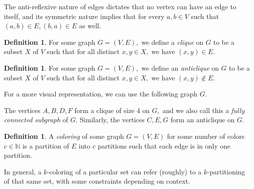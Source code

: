 \documentclass[12pt]{amsart}
\newcommand{\NN}{\mathbb{N}}
\theoremstyle{plain}
\theoremstyle{definition}
\newtheorem{defn}[thm]{Definition}
\theoremstyle{remark}
\theoremstyle{theorem}
\numberwithin{equation}{section}
\numberwithin{thm}{section}
\begin{document}
The anti-reflexive nature of edges dictates that no vertex can have an edge to itself, and its symmetric nature implies that for every $a, b \in V$ such that $(a,b) \in E, (b,a) \in E$ as well.
\begin{defn}
For some graph $G = (V,E),$ we define a \textit{clique} on $G$ to be a subset $X$ of $V$ such that for all distinct $x,y \in X,$ we have $(x,y) \in E.$
\end{defn}
\begin{defn}
For some graph $G = (V,E),$ we define an \textit{anticlique} on $G$ to be a subset $X$ of $V$ such that for all distinct $x,y \in X,$ we have $(x,y) \not \in E.$
\end{defn}
For a more visual representation, we can use the following graph $G$.
\begin{center}
\end{center}
The vertices $A,B,D,F$ form a clique of size $4$ on $G,$ and we also call this a \textit{fully connected subgraph} of $G.$ Similarly, the vertices $C,E,G$ form an anticlique on $G.$
\begin{defn}
A \textit{coloring} of some graph $G = (V,E)$ for some number of colors $c \in \NN$ is a partition of $E$ into $c$ partitions such that each edge is in only one partition.
\end{defn}
In general, a $k$-coloring of a particular set can refer (roughly) to a $k$-partitioning of that same set, with some constraints depending on context.
\end{document}

